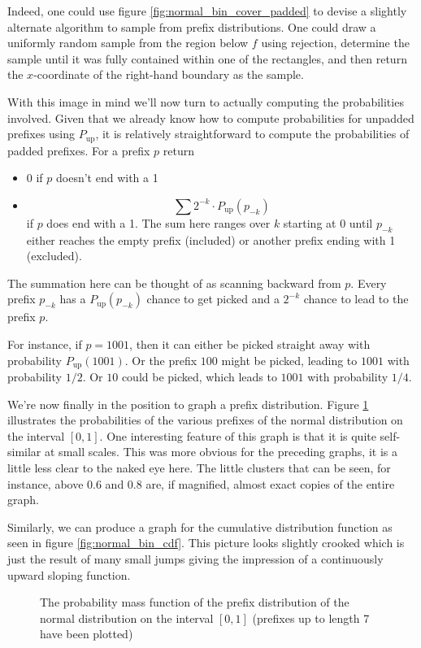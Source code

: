 Indeed, one could use figure \ref{fig:normal_bin_cover_padded} to devise a slightly alternate algorithm to sample from prefix distributions. One could draw a uniformly random sample from the region below $f$ using rejection, determine the sample until it was fully contained within one of the rectangles, and then return the $x$-coordinate of the right-hand boundary as the sample. 

With this image in mind we'll now turn to actually computing the probabilities involved. Given that we already know how to compute probabilities for unpadded prefixes using $P_{\text{up}}$, it is relatively straightforward to compute the probabilities of padded prefixes. For a prefix $p$ return
\begin{itemize}
    \item 0 if $p$ doesn't end with a 1
    \item \[\sum 2^{-k}\cdot P_{\text{up}}(p_{-k})\] if $p$ does end with a 1. The sum here ranges over $k$ starting at 0 until $p_{-k}$ either reaches the empty prefix (included) or another prefix ending with 1 (excluded).
\end{itemize}
The summation here can be thought of as scanning backward from $p$. Every prefix $p_{-k}$ has a $P_{\text{up}}(p_{-k})$ chance to get picked and a $2^{-k}$ chance to lead to the prefix $p$.

For instance, if $p = 1001$, then it can either be picked straight away with probability $P_{\text{up}}(1001)$. Or the prefix $100$ might be picked, leading to $1001$ with probability $1/2$. Or $10$ could be picked, which leads to $1001$ with probability $1/4$.

We're now finally in the position to graph a prefix distribution. Figure \ref{fig:normal_bin_pmf} illustrates the probabilities of the various prefixes of the normal distribution on the interval $[0,1]$. One interesting feature of this graph is that it is quite self-similar at small scales. This was more obvious for the preceding graphs, it is a little less clear to the naked eye here. The little clusters that can be seen, for instance, above 0.6 and 0.8 are, if magnified, almost exact copies of the entire graph.

Similarly, we can produce a graph for the cumulative distribution function as seen in figure \ref{fig:normal_bin_cdf}. This picture looks slightly crooked which is just the result of many small jumps giving the impression of a continuously upward sloping function.

\begin{figure}[h!]
    \centering
    
    \caption{The probability mass function of the prefix distribution of the normal distribution on the interval $[0,1]$ (prefixes up to length 7 have been plotted)}
    \label{fig:normal_bin_pmf}
\end{figure}

